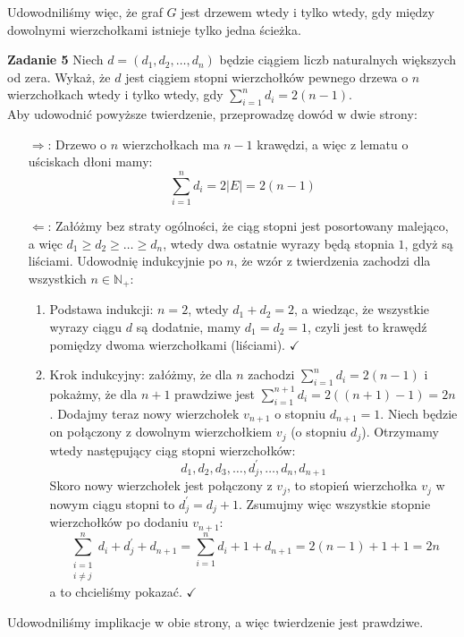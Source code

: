 \documentclass[a4paper,12pt]{article}
\newcommand{\abs}[1]{\left| #1 \right|}					%
\begin{document}
\noindent Udowodniliśmy więc, że graf $G$ jest drzewem wtedy i tylko wtedy, gdy między
dowolnymi wierzchołkami istnieje tylko jedna ścieżka.

\newpage
\noindent \textbf{Zadanie 5} \newline
Niech $d = \left( d_1, d_2, \ldots, d_n \right)$ będzie ciągiem liczb naturalnych
większych od zera. Wykaż, że $d$ jest ciągiem stopni wierzchołków pewnego drzewa
o $n$ wierzchołkach wtedy i tylko wtedy, gdy $\sum\limits_{i=1}^{n} d_i = 2(n-1)$. \\

\noindent Aby udowodnić powyższe twierdzenie, przeprowadzę dowód w dwie strony:
\begin{itemize}
    \item [$\Longrightarrow$:] Drzewo o $n$ wierzchołkach ma $n-1$ krawędzi, a więc
    z lematu o uściskach dłoni mamy: 
    \[ \sum\limits_{i=1}^{n} d_i = 2 \abs{E} =  2(n-1) \]
    \item [$\Longleftarrow$:] Załóżmy bez straty ogólności, że ciąg stopni jest 
    posortowany malejąco, a więc $d_1 \geq d_2 \geq \ldots \geq d_n$, wtedy dwa
    ostatnie wyrazy będą stopnia $1$, gdyż są liściami. Udowodnię indukcyjnie po
    $n$, że wzór z twierdzenia zachodzi dla wszystkich $n \in \mathbb{N}_+$:
    \begin{enumerate}
        \item Podstawa indukcji: $n = 2$, wtedy $d_1 + d_2 = 2$, a wiedząc, że
        wszystkie wyrazy ciągu $d$ są dodatnie, mamy $d_1 = d_2 = 1$, czyli jest
        to krawędź pomiędzy dwoma wierzchołkami (liściami). $\checkmark$
        \item Krok indukcyjny: załóżmy, że dla $n$ zachodzi 
        $\sum\limits_{i=1}^{n} d_i = 2(n-1)$ i pokażmy, że dla $n+1$ prawdziwe
        jest $\sum\limits_{i=1}^{n+1} d_i = 2\left((n+1)-1 \right) = 2n$. Dodajmy
        teraz nowy wierzchołek $v_{n+1}$ o stopniu $d_{n+1} = 1$. Niech będzie on
        połączony z dowolnym wierzchołkiem $v_j$ (o stopniu $d_j$). Otrzymamy wtedy
        następujący ciąg stopni wierzchołków:
        \[ d_1, d_2, d_3, \ldots, d_j^\prime, \ldots, d_n, d_{n+1} \]
        Skoro nowy wierzchołek jest połączony z $v_j$, to stopień wierzchołka $v_j$
        w nowym ciągu stopni to $d_j^\prime = d_j + 1$. Zsumujmy więc wszystkie
        stopnie wierzchołków po dodaniu $v_{n+1}$:
        \[ 
            \sum\limits_{\substack{i=1 \\i \neq j}}^{n} d_i + d_j^\prime + d_{n+1} 
            = \sum\limits_{i=1}^{n} d_i + 1 + d_{n+1}
            = 2(n-1) + 1 + 1 = 2n 
        \]
        a to chcieliśmy pokazać. $\checkmark$
    \end{enumerate}
\end{itemize}
Udowodniliśmy implikacje w obie strony, a więc twierdzenie jest prawdziwe.
\end{document}
